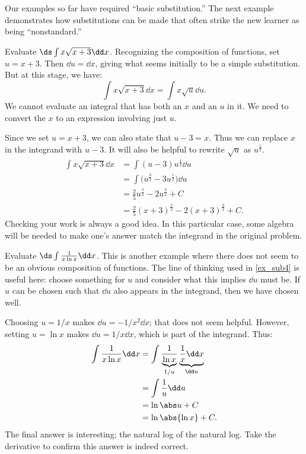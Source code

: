 Our examples so far have required ``basic substitution.'' The next example demonstrates how substitutions can be made that often strike the new learner as being ``nonstandard.''

\begin{example}\label{ex_sub4}
Evaluate $\ds\int x\sqrt{x+3}\dd x$.
\solution
Recognizing the composition of functions, set $u = x+3$. Then $\dd u = \dd x$, giving what seems initially to be a simple substitution. But at this stage, we have:\vspace{-.3\baselineskip}
	\[\int x\sqrt{x+3}\dd x = \int x\sqrt{u}\dd u.\]
We cannot evaluate an integral that has both an $x$ and an $u$ in it. We need to convert the $x$ to an expression involving just $u$.

Since we set $u = x+3$, we can also state that $u-3 = x$. Thus we can replace $x$ in the integrand with $u-3$. It will also be helpful to rewrite $\sqrt{u}$ as $u^\frac12$.
\begin{align*}
	\int x\sqrt{x+3} \dd x
	&= \int (u-3)u^\frac12\dd u \\
	&= \int \bigl(u^\frac32 - 3u^\frac12\bigr) \dd u \\
	&= \frac25u^\frac52 - 2u^\frac32 + C \\
	&= \frac25(x+3)^\frac52 - 2(x+3)^\frac32 + C.
\end{align*}
Checking your work is always a good idea. In this particular case, some algebra will be needed to make one's answer match the integrand in the original problem.
\end{example}

\begin{example}\label{ex_sub5}
Evaluate $\ds \int \frac{1}{x\ln x}\dd x$.
\solution
This is another example where there does not seem to be an obvious composition of functions. The line of thinking used in \autoref{ex_sub4} is useful here: choose something for $u$ and consider what this implies $\dd u$ must be. If $u$ can be chosen such that $\dd u$ also appears in the integrand, then we have chosen well.

Choosing $u = 1/x$ makes $\dd u = -1/x^2\dd x$; that does not seem helpful. However, setting $u = \ln x$ makes $\dd u = 1/x\dd x$, which is part of the integrand. Thus:
\begin{align*}
	\int \frac1{x\ln x}\dd x
	&= \int \frac{1}{\underbrace{\ln x}_{1/u}}\underbrace{\frac1x\dd x}_{\dd u} \\
	&= \int \frac1u\dd u \\
	&= \ln \abs u + C \\
	&= \ln \abs{\ln x} + C.
\end{align*}
The final answer is interesting; the natural log of the natural log. Take the derivative to confirm this answer is indeed correct.
\end{example}

